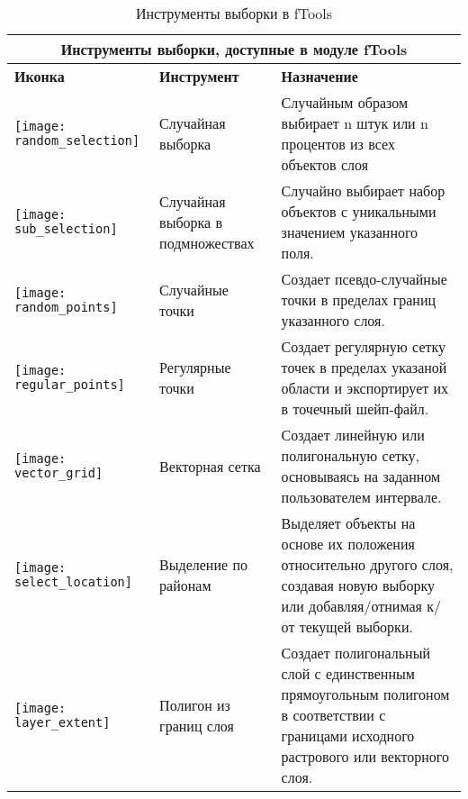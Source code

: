 \begin{table}[ht]
\centering
 \begin{tabular}{|m{1cm}|m{4cm}|m{9cm}|}
 \hline \multicolumn{3}{|c|}{\textbf{Инструменты выборки, доступные в  модуле fTools}} \\
 \hline \textbf{Иконка} & \textbf{Инструмент} & \textbf{Назначение} \\
 \hline \texttt{[image: random\_selection]} & Случайная выборка & Случайным
 образом выбирает n штук или n процентов из всех объектов слоя \\
 \hline \texttt{[image: sub\_selection]} & Случайная выборка
 в подмножествах & Случайно выбирает набор объектов с уникальными значением указанного поля. \\
 \hline \texttt{[image: random\_points]} & Случайные точки & Создает
 псевдо-случайные точки в пределах границ указанного слоя. \\
 \hline \texttt{[image: regular\_points]} & Регулярные точки & Создает
 регулярную сетку точек в пределах указаной области и экспортирует их в точечный шейп-файл. \\
 \hline \texttt{[image: vector\_grid]} & Векторная сетка & Создает
 линейную или полигональную сетку, основываясь на заданном пользователем интервале. \\
 \hline \texttt{[image: select\_location]} & Выделение по районам &
 Выделяет объекты на основе их положения относительно другого слоя, создавая новую
 выборку или добавляя/отнимая к/от текущей выборки. \\
 \hline \texttt{[image: layer\_extent]} & Полигон из границ слоя &
 Создает полигональный слой с единственным прямоугольным полигоном в соответствии
 с границами исходного растрового или векторного слоя. \\
 \hline
\end{tabular}
\caption{Инструменты выборки в fTools}\label{tab:ftool_research}
\end{table}

